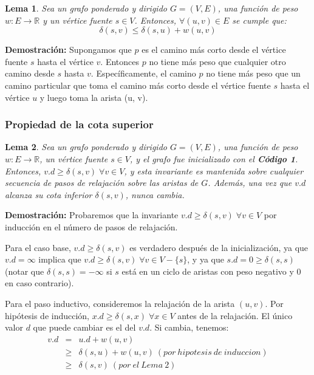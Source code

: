 \documentclass[12pt]{article}
\newcommand{\proof}{\textbf{Demostración:} }
\newcommand{\nl}{\vspace{0.3cm}}
\newtheorem{lemma}{Lema}
\begin{document}
\nl

\begin{lemma}
	Sea un grafo ponderado y dirigido $G = (V, E)$, una función de peso $w: E \rightarrow \mathbb{R}$ y un vértice fuente $s \in V$. Entonces, $\forall (u, v) \in E$ se cumple que:
	$$ \delta(s, v) \leqslant \delta(s, u) + w(u, v) $$
\end{lemma}

\proof Supongamos que $p$ es el camino más corto desde el vértice fuente $s$ hasta el vértice $v$. Entonces $p$ no tiene más peso que cualquier otro camino desde $s$ hasta $v$. Específicamente, el camino $p$ no tiene más peso que un camino particular que toma el camino más corto desde el vértice fuente $s$ hasta el vértice $u$ y luego toma la arista (u, v).

\subsubsection{Propiedad de la cota superior}

\nl

\begin{lemma}
	Sea un grafo ponderado y dirigido $G = (V, E)$, una función de peso $w: E \rightarrow \mathbb{R}$, un vértice fuente $s \in V$, y el grafo fue inicializado con el \textbf{Código 1}. Entonces, $v.d \geqslant \delta(s, v) \; \forall v \in V$, y esta invariante es mantenida sobre cualquier secuencia de pasos de relajación sobre las aristas de $G$. Además, una vez que $v.d$ alcanza su cota inferior $\delta(s, v)$, nunca cambia.
\end{lemma}

\proof Probaremos que la invariante $v.d \geqslant \delta(s, v) \; \forall v \in V$ por inducción en el número de pasos de relajación.

\nl

Para el caso base, $v.d \geqslant \delta(s, v)$ es verdadero después de la inicialización, ya que $v.d = \infty$ implica que $v.d \geqslant \delta(s, v) \; \forall v \in V - \{ s \}$, y ya que $s.d = 0 \geqslant \delta(s, s)$ (notar que $\delta(s, s) = -\infty$ si $s$ está en un ciclo de aristas con peso negativo y $0$ en caso contrario).

\nl

Para el paso inductivo, consideremos la relajación de la arista $(u, v)$. Por hipótesis de inducción, $x.d \geqslant \delta(s, x) \; \forall x \in V$ antes de la relajación. El único valor $d$ que puede cambiar es el del $v.d$. Si cambia, tenemos:
\begin{eqnarray*}
	v.d	& =       	& u.d + w(u, v) \\
	& \geqslant	& \delta(s, u) + w(u, v) \ (por\ hipotesis\ de\ induccion) \\
	& \geqslant	& \delta(s, v) \ (por\ el\ Lema\ 2)
\end{eqnarray*}
\end{document}
